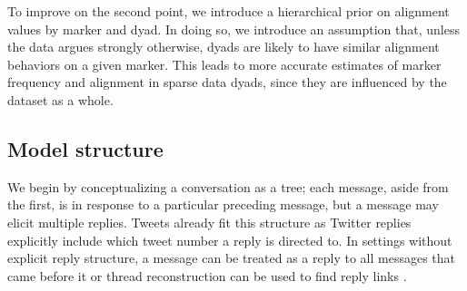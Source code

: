 \documentclass{acm_proc_article-sp}
\begin{document}
To improve on the second point, we introduce a hierarchical prior on alignment values by marker and dyad. In doing so, we introduce an assumption that, unless the data argues strongly otherwise, dyads are likely to have similar alignment behaviors on a given marker. This leads to more accurate estimates of marker frequency and alignment in sparse data dyads, since they are influenced by the dataset as a whole.  





\subsection{Model structure}
We begin by conceptualizing a conversation as a tree; each message, aside from the first, is in response to a particular preceding message, but a message may elicit multiple replies. Tweets already fit this structure as Twitter replies explicitly include which tweet number a reply is directed to.  In settings without explicit reply structure, a message can be treated as a reply to all messages that came before it \cite{WangReitterYen2014} or thread reconstruction can be used to find reply links \cite{JonesEtAl2014}.
\end{document}
